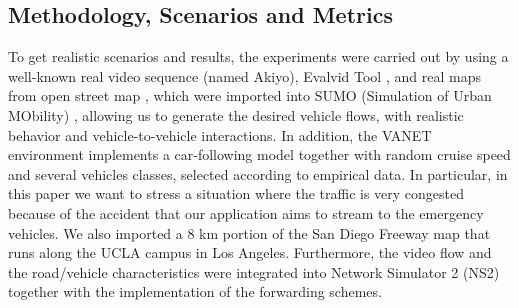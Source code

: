 \documentclass{sig-alternate-2013}
\begin{document}
\subsection{Methodology, Scenarios and Metrics}
\label{methodology}
To get realistic scenarios and results, the experiments were carried out by using a well-known real video sequence (named Akiyo), Evalvid Tool \cite{evalvid}, and real maps from open street map \cite{openstreetmap}, which were imported into SUMO (Simulation of Urban MObility) \cite{SUMO}, allowing us to generate the desired vehicle flows, with realistic behavior and vehicle-to-vehicle interactions. In addition, the VANET environment implements a car-following model together with random cruise speed and several vehicles classes, selected according to empirical data. In particular, in this paper we want to stress a situation where the traffic is very congested because of the accident that our application aims to stream to the emergency vehicles. We also imported a 8 km portion of the San Diego Freeway map that runs along the UCLA campus in Los Angeles. Furthermore, the video flow and the road/vehicle characteristics were integrated into Network Simulator 2 (NS2) \cite{ns2} together with the implementation of the forwarding schemes.

\end{document}
